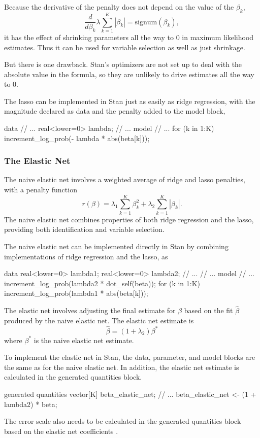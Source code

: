 Because the derivative of the penalty does not depend on the value of
the $\beta_k$,
\[
\frac{d}{d\beta_k} \lambda \sum_{k=1}^K | \beta_k | =
\mbox{signum}(\beta_k),
\]
it has the effect of shrinking parameters all the way to 0 in maximum
likelihood estimates.  Thus it can be used for variable selection as
well as just shrinkage.

But there is one drawback.  Stan's optimizers are not set up to deal
with the absolute value in the formula, so they are unlikely to drive
estimates all the way to 0.  

The lasso can be implemented in Stan just as easily as ridge
regression, with the magnitude declared as data and the penalty added
to the model block,
%
\begin{stancode}
data {
  // ...
  real<lower=0> lambda;
}
// ...
model {
  // ...
  for (k in 1:K)
    increment_log_prob(- lambda * abs(beta[k]));
}
\end{stancode}

\subsubsection{The Elastic Net}

The naive elastic net \citep{ZouHastie:2005} involves a weighted
average of ridge and lasso penalties, with a penalty function
\[
r(\beta) = \lambda_1 \sum_{k=1}^K \beta_k^2 + \lambda_2 \sum_{k=1}^K
|\beta_k|.
\]
The naive elastic net combines properties of both ridge regression and
the lasso, providing both identification and variable selection.

The naive elastic net can be implemented directly in Stan by combining
implementations of ridge regression and the lasso, as
%
\begin{stancode}
data {
  real<lower=0> lambda1;
  real<lower=0> lambda2;
  // ...
}
// ...
model {
  // ...
  increment_log_prob(lambda2 * dot_self(beta));
  for (k in 1:K)
    increment_log_prob(lambda1 * abs(beta[k]));
}
\end{stancode}
%

The elastic net \citep{ZouHastie:2005} involves adjusting the final estimate for
$\beta$ based on the fit $\hat{\beta}$ produced by the naive elastic
net.  The elastic net estimate is
\[
\hat{\beta} = (1 + \lambda_2) \beta^*
\]
where $\beta^{*}$ is the naive elastic net estimate.

To implement the elastic net in Stan, the data, parameter, and model
blocks are the same as for the naive elastic net.  In addition, the
elastic net estimate is calculated in the generated quantities block.
%
\begin{stancode}
generated quantities {
  vector[K] beta_elastic_net;
  // ...
  beta_elastic_net <- (1 + lambda2) * beta;
}
\end{stancode}
%
The error scale also needs to be calculated in the generated
quantities block based on the elastic net coefficients
.


